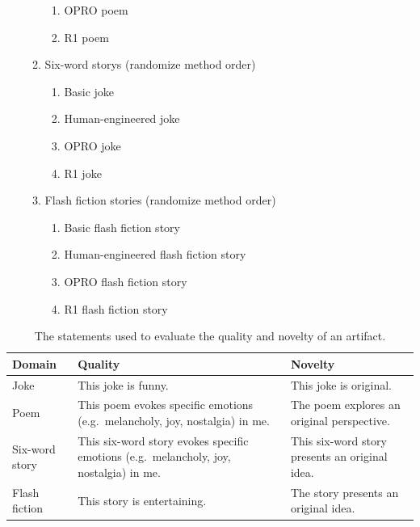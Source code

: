 \documentclass[phd,electronic,oneside,twosidetoc,letterpaper,chaptercenter,parttop,lof]{byumsphd}
\begin{document}
\begin{enumerate}
\begin{enumerate}
\begin{enumerate}
                \item OPRO poem
                \item R1 poem
            \end{enumerate}
            \item Six-word storys (randomize method order)
            \begin{enumerate}
                \item Basic joke
                \item Human-engineered joke
                \item OPRO joke
                \item R1 joke
            \end{enumerate}
            \item Flash fiction stories (randomize method order)
            \begin{enumerate}
                \item Basic flash fiction story
                \item Human-engineered flash fiction story
                \item OPRO flash fiction story
                \item R1 flash fiction story
            \end{enumerate}
        \end{enumerate}
\end{enumerate}

\begin{table}[t!]
\begin{tabular}{|p{}|p{}|p{}|}
\hline
\textbf{Domain} & \textbf{Quality} & \textbf{Novelty} \\
\hline
Joke & This joke is funny. & This joke is original. \\
\hline
Poem & This poem evokes specific emotions (e.g.\ melancholy, joy, nostalgia) in me. & The poem explores an original perspective. \\
\hline
Six-word story & This six-word story evokes specific emotions (e.g.\ melancholy, joy, nostalgia) in me. & This six-word story presents an original idea. \\
\hline
Flash fiction & This story is entertaining. & The story presents an original idea. \\
\hline
\end{tabular}
\caption{The statements used to evaluate the quality and novelty of an artifact.}
\label{table:questions}\vspace{-.1in}
\end{table}
\end{document}
